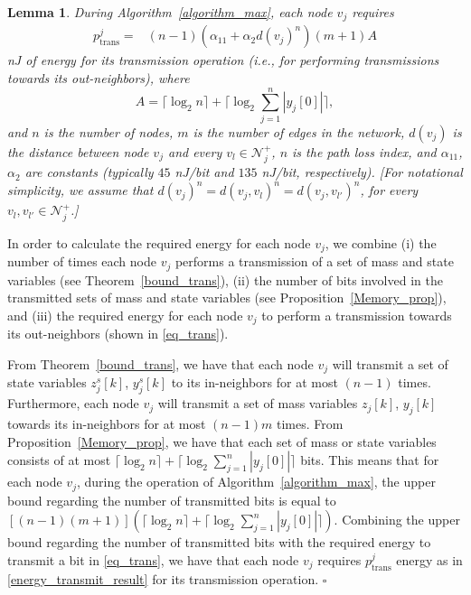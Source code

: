 \documentclass[twocolumn]{autart}    %
\newtheorem{lemma}{\bfseries Lemma}
\begin{document}
\begin{lemma}\label{energy_transmit}
During Algorithm~\ref{algorithm_max}, each node $v_j$ requires 
\begin{align}
& p^j_{\text{trans}} = & (n-1) (\alpha_{11} + \alpha_{2} d(v_j)^n) (m + 1) A & \label{energy_transmit_result}
\end{align}
nJ of energy for its transmission operation (i.e., for performing transmissions towards its out-neighbors), where 
$$
A = \lceil \log_{2} n \rceil + \lceil \log_{2} \sum_{j=1}^n | y_j[0] | \rceil , 
$$ 
and $n$ is the number of nodes, $m$ is the number of edges in the network, $d(v_j)$ is the distance between node $v_j$ and every $v_l \in \mathcal{N}_j^+$, $n$ is the path loss index, and $\alpha_{11}$, $\alpha_{2}$ are constants (typically $45$ nJ/bit and $135$ nJ/bit, respectively).  
[For notational simplicity, we assume that $d(v_j)^n = d(v_j, v_l)^n = d(v_j, v_{l'})^n$, for every $v_l, v_{l'} \in \mathcal{N}_j^+$.]
\end{lemma}

\begin{pf}
In order to calculate the required energy for each node $v_j$, we combine (i) the number of times each node $v_j$ performs a transmission of a set of mass and state variables (see Theorem~\ref{bound_trans}), (ii) the number of bits involved in the transmitted sets of mass and state variables (see Proposition~\ref{Memory_prop}), and (iii) the required energy for each node $v_j$ to perform a transmission towards its out-neighbors (shown in \eqref{eq_trans}). 

From Theorem~\ref{bound_trans}, we have that each node $v_j$ will transmit a set of state variables $z^s_j[k]$, $y^s_j[k]$ to its in-neighbors for at most $(n-1)$ times. 
Furthermore, each node $v_j$ will transmit a set of mass variables $z_j[k]$, $y_j[k]$ towards its in-neighbors for at most $(n-1) m$ times. 
From Proposition~\ref{Memory_prop}, we have that each set of mass or state variables consists of at most $\lceil \log_{2} n \rceil + \lceil \log_{2} \sum_{j=1}^n | y_j[0] | \rceil$ bits. 
This means that for each node $v_j$, during the operation of Algorithm~\ref{algorithm_max}, the upper bound regarding the number of transmitted bits is equal to $[(n-1)(m+1)] (\lceil \log_{2} n \rceil + \lceil \log_{2} \sum_{j=1}^n | y_j[0] | \rceil)$. 
Combining the upper bound regarding the number of transmitted bits with the required energy to transmit a bit in \eqref{eq_trans}, we have that each node $v_j$ requires $p^j_{\text{trans}}$ energy as in \eqref{energy_transmit_result} for its transmission operation. \hspace*{\fill} $\square$
\end{pf}
\end{document}
